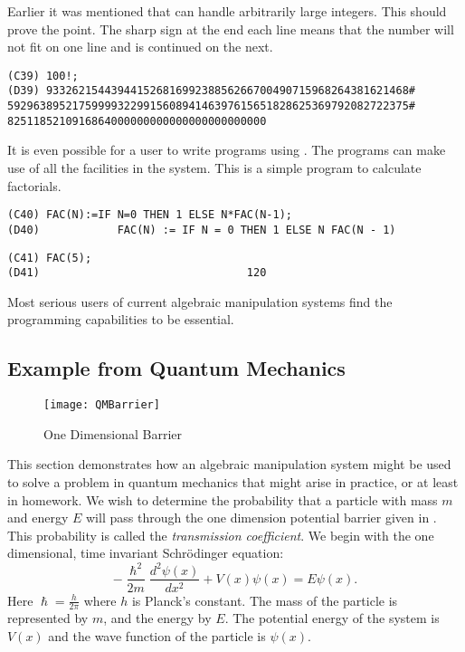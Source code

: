 Earlier it was mentioned that {\Macsyma} can handle arbitrarily large integers.
This should prove the point.  The sharp sign 
at the end each line means that
the number will not fit on one line and is continued on the next.
\begin{verbatim}
(C39) 100!;
(D39) 93326215443944152681699238856266700490715968264381621468#
59296389521759999322991560894146397615651828625369792082722375#
8251185210916864000000000000000000000000
\end{verbatim}
It is even possible for a user to write programs using {\Macsyma}.  The
programs can make use of all the facilities in the {\Macsyma} system.
This is a simple program to calculate factorials.
\begin{verbatim}
(C40) FAC(N):=IF N=0 THEN 1 ELSE N*FAC(N-1);
(D40)            FAC(N) := IF N = 0 THEN 1 ELSE N FAC(N - 1)
\end{verbatim}

\begin{verbatim}
(C41) FAC(5);
(D41)                                120
\end{verbatim}
Most serious users of current algebraic manipulation systems find the
programming capabilities to be essential.


\subsection{Example from Quantum Mechanics}
\label{Quantum:Ex:Sec}

\begin{figure}
\begin{center}
\texttt{[image: QMBarrier]}
\end{center}
\caption{One Dimensional Barrier\label{QMBarrier:Fig}}
\end{figure}

This section demonstrates how an algebraic manipulation system might
be used to solve a problem in quantum mechanics that might arise in
practice, or at least in homework.  We wish to determine the
probability that a particle with mass $m$ and energy $E$ will pass
through the one dimension potential barrier given in
.  This probability is called the {\em
transmission coefficient\/}.  We begin with the one dimensional, time
invariant Schr\"odinger equation:
\[
- \frac{\hslash^2}{2 m} \frac{d^2 \psi(x)}{dx^2} + V(x) \psi(x) = E
\psi(x).
\]
Here $\hslash = \frac{h}{2 \pi}$ where $h$ is Planck's constant.  The
mass of the particle is represented by $m$, and the energy by $E$.
The potential energy of the system is $V(x)$ and the wave function of
the particle is $\psi(x)$.

